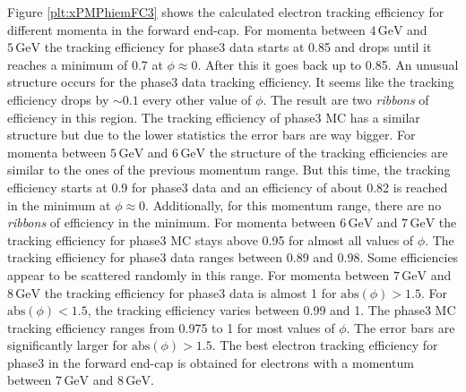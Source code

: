 \documentclass[a4paper,11pt,twosided,final,german,openbib,pdftex,listof=totoc,bibliography=totoc]{scrbook}
\begin{document}
Figure \ref{plt:xPMPhiemFC3} shows the calculated electron tracking efficiency for different momenta in the forward end-cap.
For momenta between $4\,\textrm{GeV}$ and $5\,\textrm{GeV}$ the tracking efficiency for phase3 data starts at 0.85 and drops until it reaches a minimum of 0.7 at $\phi \approx 0$. After this it goes back up to 0.85. An unusual structure occurs for the phase3 data tracking efficiency. It seems like the tracking efficiency drops by $\sim 0.1$ every other value of $\phi$. The result are two \textit{ribbons} of efficiency in this region. The tracking efficiency of phase3 MC has a similar structure but due to the lower statistics the error bars are way bigger.
For momenta between $5\,\textrm{GeV}$ and $6\,\textrm{GeV}$ the structure of the tracking efficiencies are similar to the ones of the previous momentum range. But this time, the tracking efficiency starts at 0.9 for phase3 data and an efficiency of about 0.82 is reached in the minimum at $\phi \approx 0$. Additionally, for this momentum range, there are no \textit{ribbons} of efficiency in the minimum.
For momenta between $6\,\textrm{GeV}$ and $7\,\textrm{GeV}$ the tracking efficiency for phase3 MC stays above 0.95 for almost all values of $\phi$. The tracking efficiency for phase3 data ranges between 0.89 and 0.98. Some efficiencies appear to be scattered randomly in this range.
For momenta between $7\,\textrm{GeV}$ and $8\,\textrm{GeV}$ the tracking efficiency for phase3 data is almost 1 for $\textrm{abs}(\phi) > 1.5$. For $\textrm{abs}(\phi) < 1.5$, the tracking efficiency varies between 0.99 and 1. The phase3 MC tracking efficiency ranges from 0.975 to 1 for most values of $\phi$. The error bars are significantly larger for $\textrm{abs}(\phi) > 1.5$.
The best electron tracking efficiency for phase3 in the forward end-cap is obtained for electrons with a momentum between $7\,\textrm{GeV}$ and $8\,\textrm{GeV}$.
\end{document}
